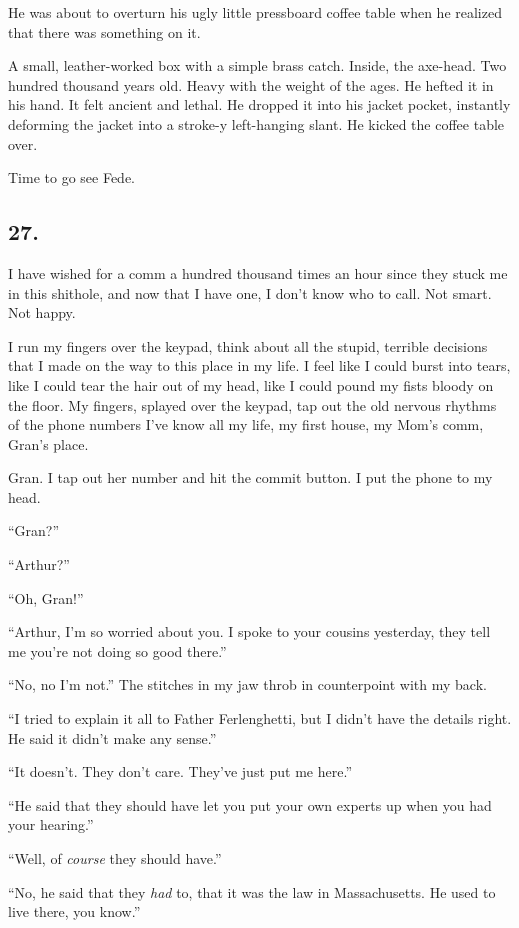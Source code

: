 He was about to overturn his ugly little pressboard coffee table
when he realized that there was something on it.

A small, leather-worked box with a simple brass catch. Inside, the
axe-head. Two hundred thousand years old. Heavy with the weight of
the ages. He hefted it in his hand. It felt ancient and lethal. He
dropped it into his jacket pocket, instantly deforming the jacket
into a stroke-y left-hanging slant. He kicked the coffee table
over.

Time to go see Fede.

\subsection{27.}

I have wished for a comm a hundred thousand times an hour since
they stuck me in this shithole, and now that I have one, I don’t
know who to call. Not smart. Not happy.

I run my fingers over the keypad, think about all the stupid,
terrible decisions that I made on the way to this place in my life.
I feel like I could burst into tears, like I could tear the hair
out of my head, like I could pound my fists bloody on the floor. My
fingers, splayed over the keypad, tap out the old nervous rhythms
of the phone numbers I’ve know all my life, my first house, my
Mom’s comm, Gran’s place.

Gran. I tap out her number and hit the commit button. I put the
phone to my head.

“Gran?”

“Arthur?”

“Oh, Gran!”

“Arthur, I’m so worried about you. I spoke to your cousins
yesterday, they tell me you’re not doing so good there.”

“No, no I’m not.” The stitches in my jaw throb in counterpoint with
my back.

“I tried to explain it all to Father Ferlenghetti, but I didn’t
have the details right. He said it didn’t make any sense.”

“It doesn’t. They don’t care. They’ve just put me here.”

“He said that they should have let you put your own experts up when
you had your hearing.”

“Well, of \emph{course} they should have.”

“No, he said that they \emph{had} to, that it was the law in
Massachusetts. He used to live there, you know.”

